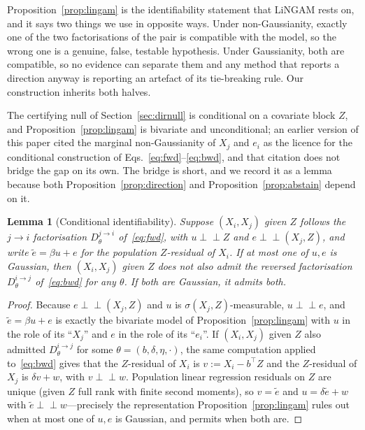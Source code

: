 \documentclass[pdflatex,sn-apa]{sn-jnl}
\theoremstyle{thmstyleone}%
\newtheorem{lemma}[theorem]{Lemma}%
\theoremstyle{thmstyletwo}%
\theoremstyle{thmstylethree}%
\newcommand{\indep}{\perp\!\!\!\perp}
\begin{document}
Proposition~\ref{prop:lingam} is the identifiability statement that LiNGAM
rests on, and it says two things we use in opposite ways. Under
non-Gaussianity, exactly one of the two factorisations of the pair is
compatible with the model, so the wrong one is a genuine, false, testable
hypothesis. Under Gaussianity, both are compatible, so no evidence can
separate them and any method that reports a direction anyway is reporting an
artefact of its tie-breaking rule. Our construction inherits both halves.

The certifying null of Section~\ref{sec:dirnull} is conditional on a
covariate block $Z$, and Proposition~\ref{prop:lingam} is bivariate and
unconditional; an earlier version of this paper cited the marginal
non-Gaussianity of $X_j$ and $e_i$ as the licence for the conditional
construction of Eqs.~\eqref{eq:fwd}--\eqref{eq:bwd}, and that citation does not
bridge the gap on its own. The bridge is short, and we record it as a lemma
because both Proposition~\ref{prop:direction} and
Proposition~\ref{prop:abstain} depend on it.

\begin{lemma}[Conditional identifiability]\label{lem:cond-lingam}
Suppose $(X_i, X_j)$ given $Z$ follows the $j \to i$ factorisation
$D^{j\to i}_\theta$ of~\eqref{eq:fwd}, with $u \indep Z$ and
$e \indep (X_j, Z)$, and write $\tilde e = \beta u + e$ for the population
$Z$-residual of $X_i$. If at most one of $u, e$ is Gaussian, then
$(X_i, X_j)$ given $Z$ does not also admit the reversed factorisation
$D^{i \to j}_\theta$ of~\eqref{eq:bwd} for any $\theta$. If both are
Gaussian, it admits both.
\end{lemma}

\begin{proof}
Because $e \indep (X_j, Z)$ and $u$ is $\sigma(X_j, Z)$-measurable, $u \indep e$,
and $\tilde e = \beta u + e$ is exactly the bivariate model of
Proposition~\ref{prop:lingam} with $u$ in the role of its ``$X_j$'' and $e$ in
the role of its ``$e_i$''. If $(X_i, X_j)$ given $Z$ also admitted
$D^{i \to j}_\theta$ for some $\theta = (b, \delta, \eta, \cdot)$, the same
computation applied to~\eqref{eq:bwd} gives that the $Z$-residual of $X_i$ is
$v := X_i - b^\top Z$ and the $Z$-residual of $X_j$ is $\delta v + w$, with
$v \indep w$. Population linear regression residuals on $Z$ are unique
(given $Z$ full rank with finite second moments), so $v = \tilde e$ and
$u = \delta \tilde e + w$ with $\tilde e \indep w$---precisely the
representation Proposition~\ref{prop:lingam} rules out when at most one of
$u, e$ is Gaussian, and permits when both are.
\end{proof}
\end{document}
